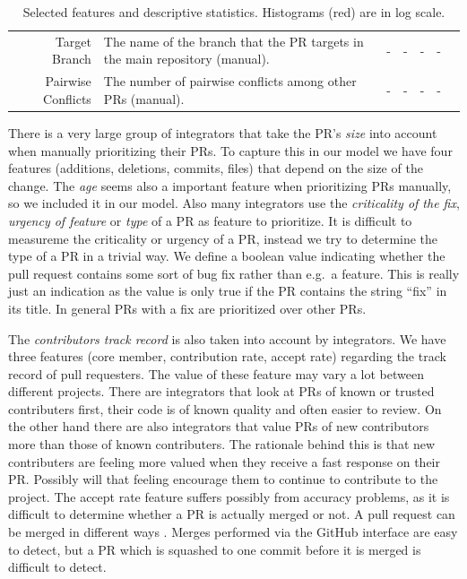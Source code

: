 \documentclass[conference]{IEEEtran}
\begin{document}
\begin{table}[ht]
\begin{tabular}{rp{26em}rrrrc}
    Target Branch & The name of the branch that the PR targets in the main repository (manual). & - & - & - & - & \\
    Pairwise Conflicts & The number of pairwise conflicts among other PRs (manual). & - & - & - & - & \\
    \hline
  \end{tabular}
  \caption{Selected features and descriptive statistics. Histograms (red) are in log scale.}
  \label{tab:features}
\end{table}

There is a very large group of integrators that take the PR's \emph{size} into account when manually prioritizing their PRs.
To capture this in our model we have four features (additions, deletions, commits, files) that depend on the size of the change.
The \emph{age} seems also a important feature when prioritizing PRs manually, so we included it in our model.
Also many integrators use the \emph{criticality of the fix}, \emph{urgency of feature} or \emph{type} of a PR as feature to prioritize.
It is difficult to measureme the criticality or urgency of a PR, instead we try to determine the type of a PR in a trivial way.
We define a boolean value indicating whether the pull request contains some sort of bug fix rather than e.g.\ a feature.
This is really just an indication as the value is only true if the PR contains the string ``fix'' in its title.
In general PRs with a fix are prioritized over other PRs.

The \emph{contributors track record} is also taken into account by integrators.
We have three features (core member, contribution rate, accept rate) regarding the track record of pull requesters.
The value of these feature may vary a lot between different projects.
There are integrators that look at PRs of known or trusted contributers first, their code is of known quality and often easier to review.
On the other hand there are also integrators that value PRs of new contributors more than those of known contributers.
The rationale behind this is that new contributers are feeling more valued when they receive a fast response on their PR.
Possibly will that feeling encourage them to continue to contribute to the project.
The accept rate feature suffers possibly from accuracy problems, as it is difficult to determine whether a PR is actually merged or not.
A pull request can be merged in different ways \cite{GPD14}.
Merges performed via the GitHub interface are easy to detect, but a PR which is squashed to one commit before it is merged is difficult to detect.
\end{document}
